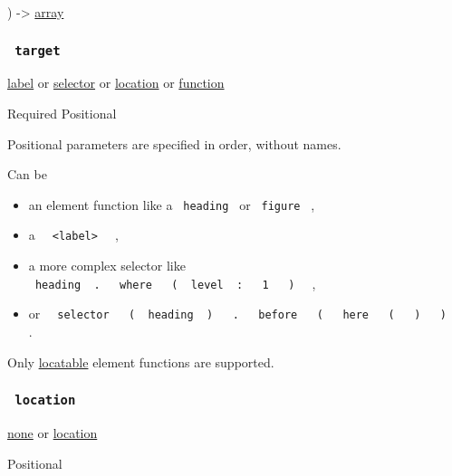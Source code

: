 ) -\textgreater{} \href{/docs/reference/foundations/array/}{array}

\subsubsection{\texorpdfstring{\texttt{\ target\ }}{ target }}\label{parameters-target}

\href{/docs/reference/foundations/label/}{label} {or}
\href{/docs/reference/foundations/selector/}{selector} {or}
\href{/docs/reference/introspection/location/}{location} {or}
\href{/docs/reference/foundations/function/}{function}

{Required} {{ Positional }}

\label{parameters-target-positional-tooltip}
Positional parameters are specified in order, without names.

Can be

\begin{itemize}
\tightlist
\item
  an element function like a \texttt{\ heading\ } or \texttt{\ figure\ }
  ,
\item
  a \texttt{\ }{\texttt{\ \textless{}label\textgreater{}\ }}\texttt{\ }
  ,
\item
  a more complex selector like
  \texttt{\ heading\ }{\texttt{\ .\ }}\texttt{\ }{\texttt{\ where\ }}\texttt{\ }{\texttt{\ (\ }}\texttt{\ level\ }{\texttt{\ :\ }}\texttt{\ }{\texttt{\ 1\ }}\texttt{\ }{\texttt{\ )\ }}\texttt{\ }
  ,
\item
  or
  \texttt{\ }{\texttt{\ selector\ }}\texttt{\ }{\texttt{\ (\ }}\texttt{\ heading\ }{\texttt{\ )\ }}\texttt{\ }{\texttt{\ .\ }}\texttt{\ }{\texttt{\ before\ }}\texttt{\ }{\texttt{\ (\ }}\texttt{\ }{\texttt{\ here\ }}\texttt{\ }{\texttt{\ (\ }}\texttt{\ }{\texttt{\ )\ }}\texttt{\ }{\texttt{\ )\ }}\texttt{\ }
  .
\end{itemize}

Only
\href{/docs/reference/introspection/location/\#locatable}{locatable}
element functions are supported.

\subsubsection{\texorpdfstring{\texttt{\ location\ }}{ location }}\label{parameters-location}

\href{/docs/reference/foundations/none/}{none} {or}
\href{/docs/reference/introspection/location/}{location}

{{ Positional }}

